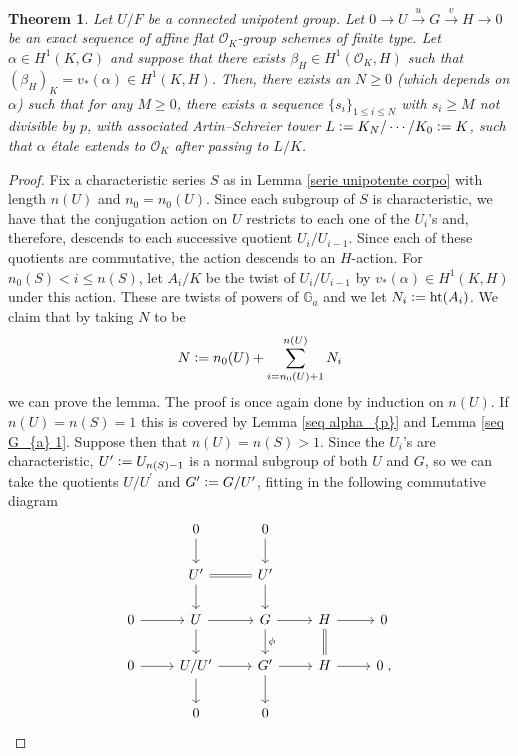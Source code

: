 \documentclass[a4paper,english,12pt]{amsart}
\newtheorem{theorem}[definition]{Theorem}
\numberwithin{equation}{section}
\newcommand{\defeq}{\vcentcolon=}
\renewcommand{\leq}{\leqslant}
\renewcommand{\geq}{\geqslant}
\renewcommand{\_}{\rule{0.25cm}{0.4pt}}
\begin{document}
\begin{theorem}\label{seq unipotente}
    Let $U/F$ be a connected unipotent group. Let $0\to U\xrightarrow{u} G\xrightarrow{v} H\to 0$ be an exact sequence of affine flat $\mathcal{O}_{K}$-group schemes of finite type. Let $\alpha\in H^{1}(K,G)$ and suppose that there exists $\beta_{H}\in H^{1}(\mathcal{O}_{K},H)$ such that $(\beta_{H})_{K}=v_{\ast}(\alpha)\in H^{1}(K,H)$. Then, there exists an $N\geq 0$ (which depends on $\alpha$) such that for any $M\geq 0$, there exists a sequence $\{s_{i}\}_{1\leq i\leq N}$ with $s_{i}\geq M$ not divisible by $p$, with associated Artin--Schreier tower $L\defeq K_{N}/\cdots/K_{0}\defeq K$, such that $\alpha$ étale extends to $\mathcal{O}_{K}$ after passing to $L/K$.
\end{theorem}
\begin{proof}
    Fix a characteristic series $S$ as in Lemma \ref{serie unipotente corpo} with length $n(U)$ and $n_{0}=n_{0}(U)$. Since each subgroup of $S$ is characteristic, we have that the conjugation action on $U$ restricts to each one of the $U_{i}$'s and, therefore, descends to each successive quotient $U_{i}/U_{i-1}$. Since each of these quotients are commutative, the action descends to an $H$-action. For $n_{0}(S)<i\leq n(S)$, let $A_{i}/K$ be the twist of $U_{i}/U_{i-1}$ by $v_{\ast}(\alpha)\in H^{1}(K,H)$ under this action. These are twists of powers of $\mathbb{G}_{a}$ and we let $N_{i}\defeq \text{ht}(A_{i})$. We claim that by taking $N$ to be
    \[
    N\defeq n_{0}(U)+\sum_{i=n_{0}(U)+1}^{n(U)}N_{i}
    \]
    we can prove the lemma. The proof is once again done by induction on $n(U)$. If $n(U)=n(S)=1$ this is covered by Lemma \ref{seq alpha_{p}} and Lemma \ref{seq G_{a} 1}. Suppose then that $n(U)=n(S)>1$. Since the $U_{i}$'s are characteristic, $U^{\prime}\defeq U_{n(S)-1}$ is a normal subgroup of both $U$ and $G$, so we can take the quotients $U/U^{\prime}$ and $G^{\prime}\defeq G/U^{\prime}$, fitting in the following commutative diagram 
    \[
    \begin{tikzcd}
        & 0\ar[d] & 0\ar[d]
        \\
        & U^{\prime}\ar[d]\ar[r, equal] & U^{\prime}\ar[d]
        \\
        0\ar[r] & U\ar[r]\ar[d] & G\ar[r]\ar[d, "\phi"] & H\ar[r]\ar[d, equal] & 0
        \\
        0\ar[r] & U/U^{\prime} \ar[r]\ar[d] & G^{\prime}\ar[r]\ar[d] & H\ar[r] & 0\;,
        \\
        & 0 & 0
    \end{tikzcd}
\]
\end{proof}
\end{document}

